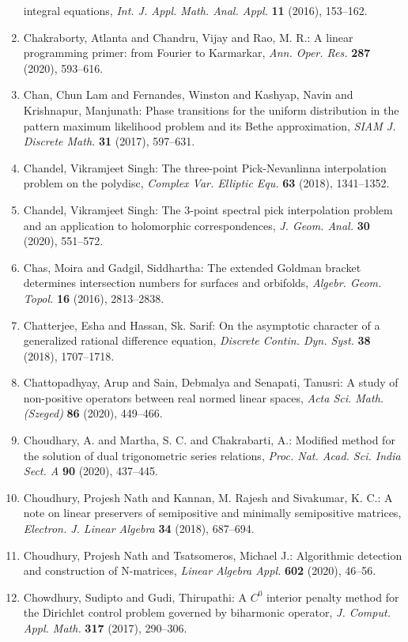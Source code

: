 \begin{enumerate}
integral equations, \emph{Int. J. Appl. Math. Anal. Appl.} {\bf 11} (2016), 153--162.
\item Chakraborty, Atlanta and Chandru, Vijay and Rao, M. R.: A linear programming primer: from {F}ourier to {K}armarkar, \emph{Ann. Oper. Res.} {\bf 287} (2020), 593--616.
\item Chan, Chun Lam and Fernandes, Winston and Kashyap, Navin and
Krishnapur, Manjunath: Phase transitions for the uniform distribution in the pattern
maximum likelihood problem and its {B}ethe approximation, \emph{SIAM J. Discrete Math.} {\bf 31} (2017), 597--631.
\item Chandel, Vikramjeet Singh: The three-point {P}ick-{N}evanlinna interpolation problem on
the polydisc, \emph{Complex Var. Elliptic Equ.} {\bf 63} (2018), 1341--1352.
\item Chandel, Vikramjeet Singh: The 3-point spectral pick interpolation problem and an
application to holomorphic correspondences, \emph{J. Geom. Anal.} {\bf 30} (2020), 551--572.
\item Chas, Moira and Gadgil, Siddhartha: The extended {G}oldman bracket determines intersection numbers
for surfaces and orbifolds, \emph{Algebr. Geom. Topol.} {\bf 16} (2016), 2813--2838.
\item Chatterjee, Esha and Hassan, Sk. Sarif: On the asymptotic character of a generalized rational
difference equation, \emph{Discrete Contin. Dyn. Syst.} {\bf 38} (2018), 1707--1718.
\item Chattopadhyay, Arup and Sain, Debmalya and Senapati, Tanusri: A study of non-positive operators between real normed linear
spaces, \emph{Acta Sci. Math. (Szeged)} {\bf 86} (2020), 449--466.
\item Choudhary, A. and Martha, S. C. and Chakrabarti, A.: Modified method for the solution of dual trigonometric series
relations, \emph{Proc. Nat. Acad. Sci. India Sect. A} {\bf 90} (2020), 437--445.
\item Choudhury, Projesh Nath and Kannan, M. Rajesh and Sivakumar,
K. C.: A note on linear preservers of semipositive and minimally
semipositive matrices, \emph{Electron. J. Linear Algebra} {\bf 34} (2018), 687--694.
\item Choudhury, Projesh Nath and Tsatsomeros, Michael J.: Algorithmic detection and construction of {N}-matrices, \emph{Linear Algebra Appl.} {\bf 602} (2020), 46--56.
\item Chowdhury, Sudipto and Gudi, Thirupathi: A {$C^0$} interior penalty method for the {D}irichlet control
problem governed by biharmonic operator, \emph{J. Comput. Appl. Math.} {\bf 317} (2017), 290--306.

\end{enumerate}
